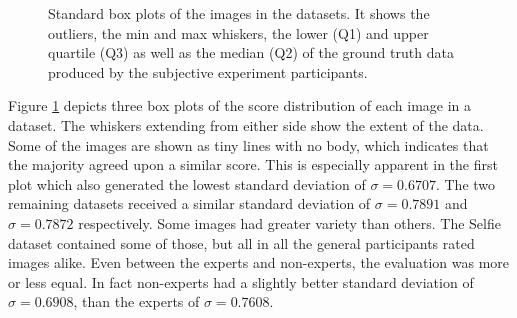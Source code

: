 \newpage

\begin{figure}[H]
\centering
        \quad
        \quad
    \caption{Standard box plots of the images in the datasets. It shows the outliers, the min and max whiskers, the lower (Q1) and upper quartile (Q3) as well as the median (Q2) of the ground truth data produced by the subjective experiment participants.}
    \label{fig:boxplot}
\end{figure}

Figure \ref{fig:boxplot} depicts three box plots of the score distribution of each image in a dataset. The whiskers extending from either side show the extent of the data. Some of the images are shown as tiny lines with no body, which indicates that the majority agreed upon a similar score. This is especially apparent in the first plot which also generated the lowest standard deviation of $\sigma = 0.6707$. The two remaining datasets received a similar standard deviation of $\sigma = 0.7891$ and $\sigma = 0.7872$ respectively. Some images had greater variety than others. The Selfie dataset contained some of those, but all in all the general participants rated images alike. Even between the experts and non-experts, the evaluation was more or less equal. In fact non-experts had a slightly better standard deviation of $\sigma = 0.6908$, than the experts of $\sigma = 0.7608$. 


